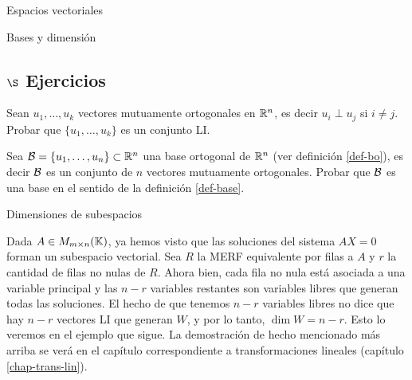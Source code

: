 \begin{chapter}{Espacios vectoriales}
\begin{section}{Bases y dimensi\'on}
    \subsection*{$\S$ Ejercicios}
    \begin{enumex}
        \item Sean $u_1,\ldots,u_k$ vectores mutuamente ortogonales en $\mathbb R^n$,  es decir $u_i \perp u_j$  si $i \ne j$. Probar que  $\{u_1,\ldots,u_k\}$ es un conjunto LI.
        \item 
        Sea $\mathcal{B} =\{u_1,\ldots,u_n\}\subset \mathbb R^n$  una base ortogonal de $\mathbb R^n$ (ver definición \ref{def-bo}),  es decir $\mathcal{B}$  es un conjunto de $n$ vectores mutuamente ortogonales. Probar  que $\mathcal{B}$ es una base en el sentido de la definición \ref{def-base}.   
    \end{enumex}


    \end{section}



    
    \begin{section}{Dimensiones de subespacios}\label{seccion-dimensiones-de-subespacios}
        
            
        Dada $A \in M_{m\times n}(\mathbb K)$,  ya hemos visto que  las soluciones del sistema $AX=0$ forman un subespacio vectorial. Sea $R $ la MERF equivalente por filas a $A$ y $r$ la cantidad de filas no nulas de $R$. Ahora bien, cada fila no nula está asociada  a una  variable principal y las  $n-r$ variables restantes son variables libres  que generan  todas las soluciones.
        El  hecho de que tenemos $n-r$ variables libres no dice que hay $n-r$ vectores LI que generan $W$, y por lo tanto,  $\dim W = n-r$. Esto lo veremos en el ejemplo que sigue. La demostración de hecho mencionado más arriba se verá en el capítulo correspondiente  a transformaciones lineales (capítulo \ref{chap-trans-lin}).
        

\end{section}
\end{chapter}
